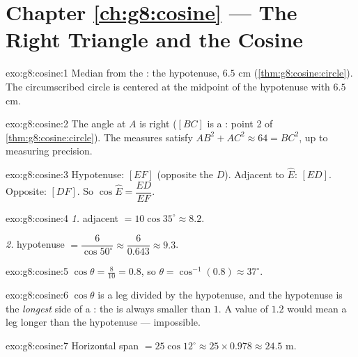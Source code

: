 \section*{Chapter \ref{ch:g8:cosine} --- The Right Triangle and the Cosine}

\begin{solution}{exo:g8:cosine:1}
Median from the :  the hypotenuse, $6.5$ cm
(\cref{thm:g8:cosine:circle}). The circumscribed circle is centered
at the midpoint of the hypotenuse with  $6.5$ cm.
\end{solution}

\begin{solution}{exo:g8:cosine:2}
The angle at $A$ is right ($[BC]$ is a : point 2 of
\cref{thm:g8:cosine:circle}). The measures satisfy
$AB^2 + AC^2 \approx 64 = BC^2$, up to measuring precision.
\end{solution}

\begin{solution}{exo:g8:cosine:3}
Hypotenuse: $[EF]$ (opposite the  $D$). Adjacent to
$\widehat E$: $[ED]$. Opposite: $[DF]$. So
$\cos\widehat E = \dfrac{ED}{EF}$.
\end{solution}

\begin{solution}{exo:g8:cosine:4}
\emph{1.} adjacent $= 10 \cos 35^\circ \approx 8.2$.

\emph{2.} hypotenuse $= \dfrac{6}{\cos 50^\circ} \approx
\dfrac{6}{0.643} \approx 9.3$.
\end{solution}

\begin{solution}{exo:g8:cosine:5}
$\cos\theta = \frac{8}{10} = 0.8$, so
$\theta = \cos^{-1}(0.8) \approx 37^\circ$.
\end{solution}

\begin{solution}{exo:g8:cosine:6}
$\cos\theta$ is a leg divided by the hypotenuse, and the hypotenuse
is the \emph{longest} side of a : the  is
always smaller than $1$. A value of $1.2$ would mean a leg longer
than the hypotenuse --- impossible.
\end{solution}

\begin{solution}{exo:g8:cosine:7}
Horizontal span $= 25 \cos 12^\circ \approx 25 \times 0.978 \approx
24.5$ m.
\end{solution}

